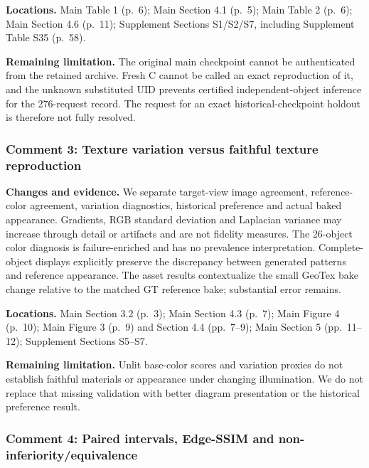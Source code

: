 \documentclass[
  10pt,
]{article}
\begin{document}
\textbf{Locations.} Main Table 1 (p.~6); Main Section 4.1 (p.~5); Main
Table 2 (p.~6); Main Section 4.6 (p.~11); Supplement Sections S1/S2/S7,
including Supplement Table S35 (p.~58).

\textbf{Remaining limitation.} The original main checkpoint cannot be
authenticated from the retained archive. Fresh C cannot be called an
exact reproduction of it, and the unknown substituted UID prevents
certified independent-object inference for the 276-request record. The
request for an exact historical-checkpoint holdout is therefore not
fully resolved.

\hypertarget{comment-3-texture-variation-versus-faithful-texture-reproduction}{%
\subsubsection{Comment 3: Texture variation versus faithful texture
reproduction}\label{comment-3-texture-variation-versus-faithful-texture-reproduction}}

\textbf{Changes and evidence.} We separate target-view image agreement,
reference-color agreement, variation diagnostics, historical preference
and actual baked appearance. Gradients, RGB standard deviation and
Laplacian variance may increase through detail or artifacts and are not
fidelity measures. The 26-object color diagnosis is failure-enriched and
has no prevalence interpretation. Complete-object displays explicitly
preserve the discrepancy between generated patterns and reference
appearance. The asset results contextualize the small GeoTex bake change
relative to the matched GT reference bake; substantial error remains.

\textbf{Locations.} Main Section 3.2 (p.~3); Main Section 4.3 (p.~7);
Main Figure 4 (p.~10); Main Figure 3 (p.~9) and Section 4.4 (pp.~7--9);
Main Section 5 (pp.~11--12); Supplement Sections S5--S7.

\textbf{Remaining limitation.} Unlit base-color scores and variation
proxies do not establish faithful materials or appearance under changing
illumination. We do not replace that missing validation with better
diagram presentation or the historical preference result.

\hypertarget{comment-4-paired-intervals-edge-ssim-and-non-inferiorityequivalence}{%
\subsubsection{Comment 4: Paired intervals, Edge-SSIM and
non-inferiority/equivalence}\label{comment-4-paired-intervals-edge-ssim-and-non-inferiorityequivalence}}
\end{document}
